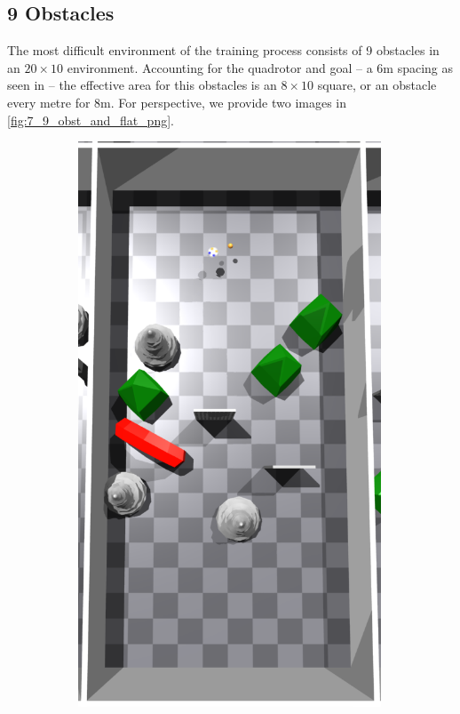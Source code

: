 \subsection{9 Obstacles}
\label{subsec:7_9_obstacles}
The most difficult environment of the training process consists of 9 obstacles in an $20\times10$ environment. Accounting for the quadrotor and goal -- a 6m spacing as seen in  -- the effective area for this obstacles is an $8\times10$ square, or an obstacle every metre for 8m. 
For perspective, we provide two images in \cref{fig:7_9_obst_and_flat_png}. 
\begin{figure}[htb]
    \centering
    \begin{subfigure}[b]{0.26\textwidth}
        \centering
        \captionsetup{justification=centering}
        \includegraphics[width=0.99\textwidth]{figures/7_/7_9_obst.png}

\end{subfigure}
\end{figure}
